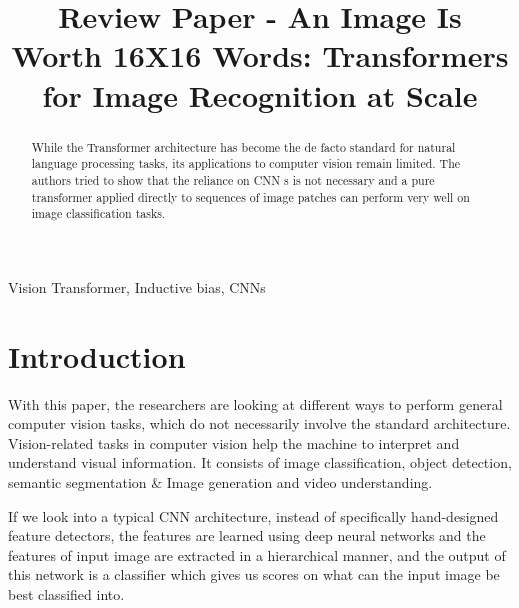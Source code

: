 \documentclass[conference]{IEEEtran}
\begin{document}
\title{Review Paper - An Image Is Worth 16X16 Words: Transformers for Image Recognition at Scale}

\author{
}

\maketitle

\begin{abstract}
While the Transformer architecture has become the de facto standard for natural language processing tasks, its applications to computer vision remain limited. The authors tried to show that the reliance on CNN s is not necessary and a pure transformer applied directly to sequences of image patches can perform very well on image classification tasks.
\end{abstract}

\begin{IEEEkeywords}
Vision Transformer, Inductive bias, CNNs
\end{IEEEkeywords}

\section{Introduction}
With this paper, the researchers are looking at different ways to perform general computer vision tasks, which do not necessarily involve the standard architecture. Vision-related tasks in computer vision help the machine to interpret and understand visual information. It consists of image classification, object detection, semantic segmentation \& Image generation and video understanding.

If we look into a typical CNN architecture, instead of specifically hand-designed feature detectors, the features are learned using deep neural networks and the features of input image are extracted in a hierarchical manner, and the output of this network is a classifier which gives us scores on what can the input image be best classified into.
\end{document}
